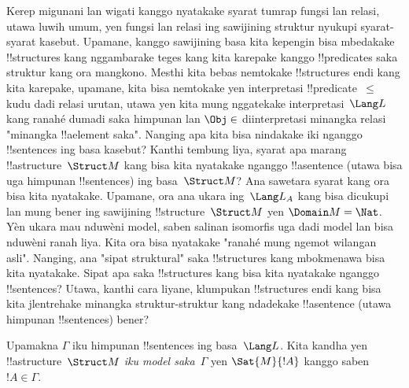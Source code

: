 \documentclass[../../../include/open-logic-section]{subfiles}
\begin{document}


\begin{explain}
Kerep migunani lan wigati kanggo nyatakake syarat tumrap
fungsi lan relasi, utawa luwih umum, yen fungsi lan relasi
ing sawijining struktur nyukupi syarat-syarat kasebut.
Upamane, kanggo sawijining basa kita kepengin
bisa mbedakake !!{structure}s kang nggambarake
teges kang kita karepake kanggo !!{predicate}s
saka struktur kang ora mangkono. Mesthi kita bebas nemtokake
!!{structure}s endi kang kita karepake, upamane,
kita bisa nemtokake yen interpretasi !!{predicate}~$\le$
kudu dadi relasi urutan, utawa yen kita mung nggatekake
interpretasi~$\Lang L$ kang ranahé dumadi saka himpunan
lan $\Obj \in$ diinterpretasi minangka relasi
"minangka !!a{element} saka". Nanging apa kita bisa
nindakake iki nganggo !!{sentence}s ing basa kasebut?
Kanthi tembung liya, syarat apa marang
!!a{structure}~$\Struct M$ kang bisa kita nyatakake
nganggo !!a{sentence} (utawa bisa uga himpunan
!!{sentence}s) ing basa~$\Struct M$? Ana sawetara
syarat kang ora bisa kita nyatakake. Upamane,
ora ana ukara ing~$\Lang L_A$ kang bisa dicukupi lan mung bener
ing sawijining !!{structure}~$\Struct M$ yen
$\Domain M = \Nat$. Yèn ukara mau nduwèni model, saben salinan isomorfis uga dadi model lan bisa nduwèni ranah liya. Kita ora bisa nyatakake
"ranahé mung ngemot wilangan asli". Nanging,
ana "sipat struktural" saka !!{structure}s
kang mbokmenawa bisa kita nyatakake. Sipat apa
saka !!{structure}s kang bisa kita nyatakake
nganggo !!{sentence}s? Utawa, kanthi cara liyane,
klumpukan !!{structure}s endi kang bisa kita
jlentrehake minangka struktur-struktur kang
ndadekake !!a{sentence} (utawa himpunan
!!{sentence}s) bener?
\end{explain}

\begin{defn}
Upamakna $\Gamma$ iku himpunan !!{sentence}s ing
basa~$\Lang L$. Kita kandha yen !!a{structure}~$\Struct M$
\emph{iku model saka}~$\Gamma$ yen $\Sat{M}{!A}$
kanggo saben $!A \in \Gamma$.
\end{defn}
\end{document}
